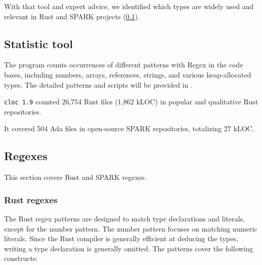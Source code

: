 \documentclass[nomenclature, english, bibtex]{kththesis}
\begin{document}
With that tool and expert advice, we identified which types are widely used and relevant in Rust and SPARK projects (\cref{sec:stats}).

\subsection{Statistic tool}
\label{sec:stats}


The program counts occurrences of different patterns with Regex in the code bases, including numbers, arrays, references, strings, and various heap-allocated types. The detailed patterns and scripts will be provided in .

\texttt{cloc 1.9} counted 26,754 Rust files (1,862 k\gls{LOC}) in popular and qualitative Rust repositories.

It covered 504 Ada files in open-source SPARK repositories, totalizing 27 kLOC.

\subsection{Regexes}
This section covers Rust and SPARK regexes.
\subsubsection{Rust regexes}

The Rust regex patterns are designed to match type declarations and literals, except for the number pattern. The number pattern focuses on matching numeric literals. Since the Rust compiler is generally efficient at deducing the types, writing a type declaration is generally omitted. The patterns cover the following constructs:
\end{document}
